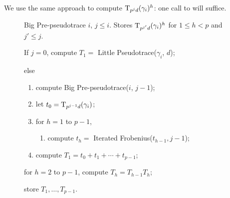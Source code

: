 We use the same approach to compute $\operatorname{T}_{p^jd}(\gamma_i)^h$: one
call to  will suffice.

\begin{figure}[h]
  \begin{algorithm}
    {Big Pre-pseudotrace}
    {$i$, $j\le i$.}
    {Stores $\operatorname{T}_{p^{j'}d}(\gamma_i)^h$ for $1\le h < p$ and $j'\le j$.}
  \item \label{alg:prepseudo:base}If $j = 0$, compute $T_1 = $ Little
    Pseudotrace($\gamma_i$, $d$);
  \item else
    \begin{enumerate}
    \item \label{alg:prepseudo:rec}compute Big Pre-pseudotrace($i$, $j-1$);
    \item \label{alg:prepseudo:retrieve}let $t_0 =
      \operatorname{T}_{p^{j-1}d}(\gamma_i)$;
    \item for $h = 1$ to $p-1$,
      \begin{enumerate}
      \item \label{alg:prepseudo:frob}compute $t_h = $ Iterated
        Frobenius($t_{h-1}, j-1$);
      \end{enumerate}
    \item compute $T_1 = t_0 + t_1 + \cdots + t_{p-1}$;
    \end{enumerate}
  \item \label{alg:prepseudo:for}for $h = 2$ to $p-1$, compute $T_h =
    T_{h-1}T_h$;
  \item store $T_1,\ldots,T_{p-1}$.
  \end{algorithm}
\end{figure}


